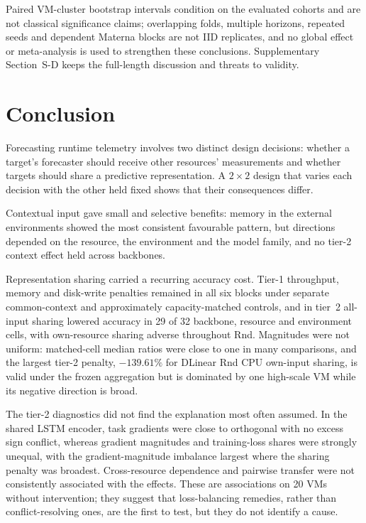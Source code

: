 \documentclass[5p,twocolumn]{elsarticle}
\begin{document}
Paired VM-cluster bootstrap intervals condition on the evaluated cohorts and
are not classical significance claims; overlapping folds, multiple horizons,
repeated seeds and dependent Materna blocks are not IID replicates, and no
global effect or meta-analysis is used to strengthen these conclusions.
Supplementary Section~S-D keeps the full-length discussion and threats to
validity.

\section{Conclusion}
\label{sec:conclusion}

Forecasting runtime telemetry involves two distinct design decisions: whether
a target's forecaster should receive other resources' measurements and
whether targets should share a predictive representation. A $2\times2$
design that varies each decision with the other held fixed shows that their
consequences differ.

Contextual input gave small and selective benefits: memory in the external
environments showed the most consistent favourable pattern, but directions
depended on the resource, the environment and the model family, and no
tier-2 context effect held across backbones.

Representation sharing carried a recurring accuracy cost. Tier-1 throughput,
memory and disk-write penalties remained in all six blocks under separate
common-context and approximately capacity-matched controls, and in tier~2
all-input sharing lowered accuracy in 29 of 32 backbone, resource and
environment cells, with own-resource sharing adverse throughout Rnd.
Magnitudes were not uniform: matched-cell median ratios were close to one in
many comparisons, and the largest tier-2 penalty, $-139.61\%$ for DLinear Rnd
CPU own-input sharing, is valid under the frozen aggregation but is dominated
by one high-scale VM while its negative direction is broad.

The tier-2 diagnostics did not find the explanation most often assumed. In
the shared LSTM encoder, task gradients were close to orthogonal with no
excess sign conflict, whereas gradient magnitudes and training-loss shares
were strongly unequal, with the gradient-magnitude imbalance largest where
the sharing penalty was broadest. Cross-resource dependence and pairwise
transfer were not consistently associated with the effects. These are
associations on 20 VMs without intervention; they suggest that
loss-balancing remedies, rather than conflict-resolving ones, are the
first to test, but they do not identify a cause.
\end{document}
